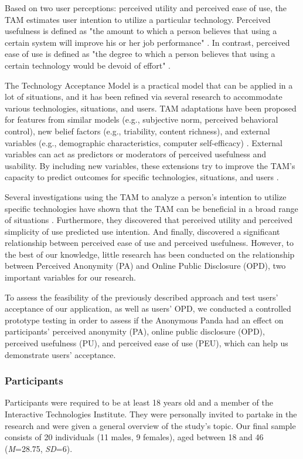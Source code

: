 Based on two user perceptions: perceived utility and perceived ease of use, the TAM estimates user intention to utilize a particular technology. Perceived usefulness is defined as "the amount to which a person believes that using a certain system will improve his or her job performance" \cite{DAV89}. In contrast, perceived ease of use is defined as "the degree to which a person believes that using a certain technology would be devoid of effort" \cite{DAV89}.

The Technology Acceptance Model is a practical model that can be applied in a lot of situations, and it has been refined via several research to accommodate various technologies, situations, and users. TAM adaptations have been proposed for features from similar models (e.g., subjective norm, perceived behavioral control), new belief factors (e.g., triability, content richness), and external variables (e.g., demographic characteristics, computer self-efficacy) \cite{CAM20}. External variables can act as predictors or moderators of perceived usefulness and usability. By including new variables, these extensions try to improve the TAM's capacity to predict outcomes for specific technologies, situations, and users \cite{CAM20}.

Several investigations using the TAM to analyze a person's intention to utilize specific technologies have shown that the TAM can be beneficial in a broad range of situations \cite{CAM20}. Furthermore, they discovered that perceived utility and perceived simplicity of use predicted use intention. And finally, discovered a significant relationship between perceived ease of use and perceived usefulness. However, to the best of our knowledge, little research has been conducted on the relationship between Perceived Anonymity (PA) and Online Public Disclosure (OPD), two important variables for our research.

To assess the feasibility of the previously described approach and test users' acceptance of our application, as well as users' OPD, we conducted a controlled prototype testing in order to assess if the Anonymous Panda had an effect on participants' perceived anonymity (PA), online public disclosure (OPD), perceived usefulness (PU), and perceived ease of use (PEU), which can help us demonstrate users' acceptance.

\subsubsection{Participants}
Participants were required to be at least 18 years old and a member of the Interactive Technologies Institute. They were personally invited to partake in the research and were given a general overview of the study's topic. Our final sample consists of 20 individuals (11 males, 9 females), aged between 18 and 46 (\textit{M}=28.75, \textit{SD}=6).

